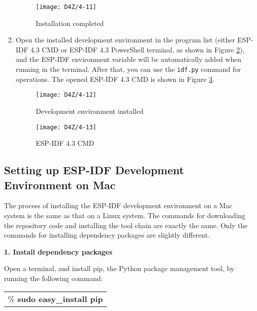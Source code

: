 \documentclass[a4paper,12pt]{book}
\begin{document}
\begin{enumerate}[label=(\arabic*)]
    \begin{figure}[h!]
        \centering
        \texttt{[image: D4Z/4-11]}
        \caption{Installation completed}
        \label{Installation completed}
    \end{figure}

    \item Open the installed development environment in the program list (either ESP-IDF 4.3 CMD or ESP-IDF 4.3 PowerShell terminal, as shown in Figure \ref{Development environment installed}), and the ESP-IDF environment variable will be automatically added when running in the terminal. After that, you can use the \verb|idf.py| command for operations. The opened ESP-IDF 4.3 CMD is shown in Figure \ref{ESP-IDF 4.3 CMD}.

    \begin{figure}[h!]
        \centering
        \texttt{[image: D4Z/4-12]}
        \caption{Development environment installed}
        \label{Development environment installed}
    \end{figure}

    \begin{figure}[h!]
        \centering
        \texttt{[image: D4Z/4-13]}
        \caption{ESP-IDF 4.3 CMD}
        \label{ESP-IDF 4.3 CMD}
    \end{figure}
\end{enumerate}

\subsection{Setting up ESP-IDF Development Environment on Mac}
The process of installing the ESP-IDF development environment on a Mac system is the same as that on a Linux system. The commands for downloading the repository code and installing the tool chain are exactly the same. Only the commands for installing dependency packages are slightly different.

\textbf{1. Install dependency packages}

Open a terminal, and install pip, the Python package management tool, by running the following command:

\begin{codebloc}
\begin{tabular}{d}
\% \textbf{sudo easy\_install pip}
\end{tabular}
\end{codebloc}
\end{document}
